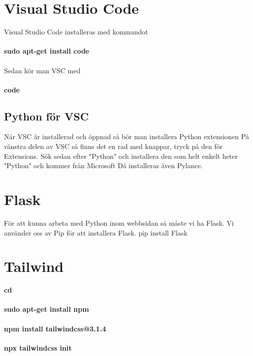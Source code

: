 \documentclass{TDP003mall}
\begin{document}
\section{Visual Studio Code}
Visual Studio Code installeras med kommandot\\\\
\textbf{sudo apt-get install code}\\\\ 
Sedan kör man VSC med\\\\
\textbf{code}
\subsection{Python för VSC}
När VSC är installerad och öppnad så bör man installera Python extensionen
På vänstra delen av VSC så finns det en rad med knappar, tryck på den för Extensions.
Sök sedan efter "Python" och installera den som helt enkelt heter "Python" och kommer från Microsoft
Då installeras även Pylance.


\section{Flask}
För att kunna arbeta med Python inom webbsidan så måste vi ha Flask. 
Vi använder oss av Pip för att installera Flask.
pip install Flask

\section{Tailwind}
\textbf{cd ~}\\\\
\textbf{sudo apt-get install npm}\\\\
\textbf{npm install tailwindcss@3.1.4}\\\\
\textbf{npx tailwindcss init}\\\\
\end{document}
